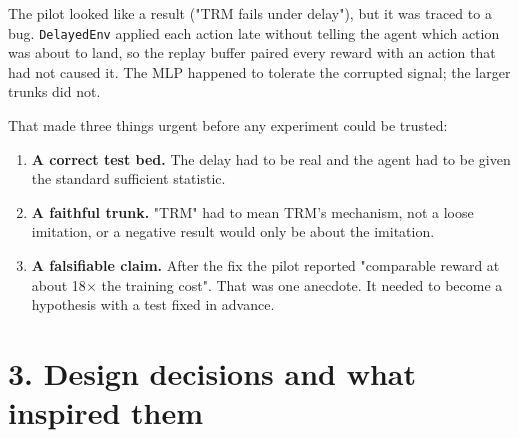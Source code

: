 \documentclass[11pt]{article}
\begin{document}
The pilot looked like a result ("TRM fails under delay"), but it was traced to a bug. \texttt{DelayedEnv} applied each action late without telling the agent which action was about to land, so the replay buffer paired every reward with an action that had not caused it. The MLP happened to tolerate the corrupted signal; the larger trunks did not.



That made three things urgent before any experiment could be trusted:



\begin{enumerate}
\item \textbf{A correct test bed.} The delay had to be real and the agent had to be given the standard sufficient statistic.
\item \textbf{A faithful trunk.} "TRM" had to mean TRM's mechanism, not a loose imitation, or a negative result would only be about the imitation.
\item \textbf{A falsifiable claim.} After the fix the pilot reported "comparable reward at about 18$\times$ the training cost". That was one anecdote. It needed to become a hypothesis with a test fixed in advance.
\end{enumerate}



\section*{3. Design decisions and what inspired them}
\end{document}
